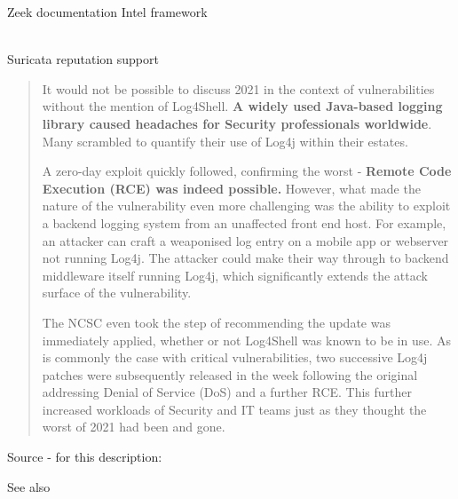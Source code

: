 \documentclass[Screen16to9,17pt]{foils}
\begin{document}

\begin{list1}
\item Zeek documentation Intel framework\\
\\
\item Suricata reputation support\\
\end{list1}



\begin{quote}\small
It would not be possible to discuss 2021 in the context of vulnerabilities without the mention of Log4Shell. {\bf A widely used Java-based logging library caused headaches for Security professionals worldwide}. Many scrambled to quantify their use of Log4j within their estates.

A zero-day exploit quickly followed, confirming the worst - {\bf Remote Code Execution (RCE) was indeed possible.} However, what made the nature of the vulnerability even more challenging was the ability to exploit a backend logging system from an unaffected front end host. For example, an attacker can craft a weaponised log entry on a mobile app or webserver not running Log4j. The attacker could make their way through to backend middleware itself running Log4j, which significantly extends the attack surface of the vulnerability.

The NCSC even took the step of recommending the update was immediately applied, whether or not Log4Shell was known to be in use. As is commonly the case with critical vulnerabilities, two successive Log4j patches were subsequently released in the week following the original addressing Denial of Service (DoS) and a further RCE. This further increased workloads of Security and IT teams just as they thought the worst of 2021 had been and gone.
\end{quote}
Source - for this description:\\

See also 


\end{document}
